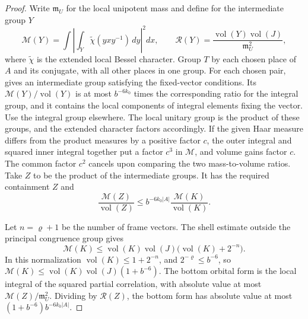 \begin{proof}
Write $\mathfrak m_U$ for the local unipotent mass and define for the intermediate group $Y$
\[
 \mathcal M(Y)=\int\left|\int_Y\widetilde\chi(yxy^{-1})\,dy\right|^2dx,
 \qquad
 \mathcal R(Y)=\frac{\operatorname{vol}(Y)\operatorname{vol}(J)}
                       {\mathfrak m_U^2},
\]
where $\widetilde\chi$ is the extended local Bessel character.
Group $T$ by each chosen place of $A$ and its conjugate, with all other places in one group.
For each chosen pair,  gives an intermediate group satisfying the fixed-vector conditions.
Its $\mathcal M(Y)/\operatorname{vol}(Y)$ is at most $b^{-6k_0}$ times the corresponding ratio for the integral group,
and it contains the local components of integral elements fixing the vector. Use the integral group elsewhere.
The local unitary group is the product of these groups, and the extended character factors accordingly.
If the given Haar measure differs from the product measures by a positive factor $c$,
the outer integral and squared inner integral together put a factor $c^3$ in $\mathcal M$, and volume gains factor $c$.
The common factor $c^2$ cancels upon comparing the two mass-to-volume ratios.
Take $Z$ to be the product of the intermediate groups. It has the required containment $Z$ and
\[
 \frac{\mathcal M(Z)}{\operatorname{vol}(Z)}
 \le b^{-6k_0|A|}\frac{\mathcal M(K)}{\operatorname{vol}(K)} .
\]

Let $n=\varrho+1$ be the number of frame vectors. The shell estimate outside the principal congruence group gives
\[
 \mathcal M(K)\le\operatorname{vol}(K)\operatorname{vol}(J)
 \bigl(\operatorname{vol}(K)+2^{-n}\bigr).
\]
In this normalization $\operatorname{vol}(K)\le1+2^{-n}$, and
$2^{-\varrho}\le b^{-6}$, so
$\mathcal M(K)\le\operatorname{vol}(K)\operatorname{vol}(J)(1+b^{-6})$.
The bottom orbital form is the local integral of the squared partial correlation,
with absolute value at most $\mathcal M(Z)/\mathfrak m_U^2$.
Dividing by $\mathcal R(Z)$, the bottom form has absolute value at most
$(1+b^{-6})b^{-6k_0|A|}$.


\end{proof}
